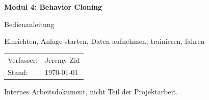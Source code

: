 \documentclass[
  a4paper,
  11pt,
  oneside,
  parskip=half,
  listof=totoc,
  numbers=noenddot
]{scrreprt}
\newcommand{\doctitle}{Modul 4: Behavior Cloning}
\newcommand{\docsubtitle}{Bedienanleitung}
\newcommand{\docauthor}{Jeremy Zid}
\begin{document}
\begin{titlepage}
  \centering
  \vspace*{4cm}
  {\LARGE\bfseries \doctitle\par}
  \vspace{0.8cm}
  {\Large \docsubtitle\par}
  \vspace{0.5cm}
  {\large Einrichten, Anlage starten, Daten aufnehmen, trainieren, fahren\par}
  \vfill
  \begin{tabular}{ll}
    Verfasser: & \docauthor \\
    Stand:     & \today \\
  \end{tabular}\par
  \vspace{1cm}
  {\small Internes Arbeitsdokument, nicht Teil der Projektarbeit.\par}
\end{titlepage}

\tableofcontents
{}









\end{document}
